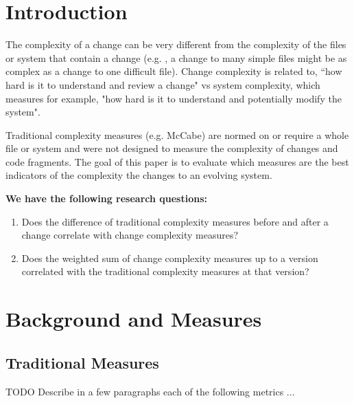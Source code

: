 \documentclass[11pt,twocolumn,a4paper]{article}
\newcommand*{\eg}{e.g. }
\begin{document}
\section{Introduction}

The complexity of a change can be very different from the complexity of the
files or system that contain a change (\eg, a change to many simple files
might be as complex as a change to one difficult file). Change complexity is
related to, ``how hard is it to understand and review a change" vs system
complexity, which measures for example, "how hard is it to understand and
potentially modify the system". 

Traditional complexity measures (\eg McCabe) are normed on or require a whole
file or system and were not designed to measure the complexity of changes and
code fragments. The goal of this paper is to evaluate which measures are the
best indicators of the complexity the changes to an evolving system. 


\textbf{We have the following research questions:}

\begin{enumerate}

\item Does the difference of traditional complexity measures before and after a change correlate with change complexity measures?

\item Does the weighted sum of change complexity measures up to a version correlated with the traditional complexity measures at that version? 

\end{enumerate}

\section{Background and Measures}

\subsection{Traditional Measures}
TODO Describe in a few paragraphs each of the following metrics ...
\end{document}
